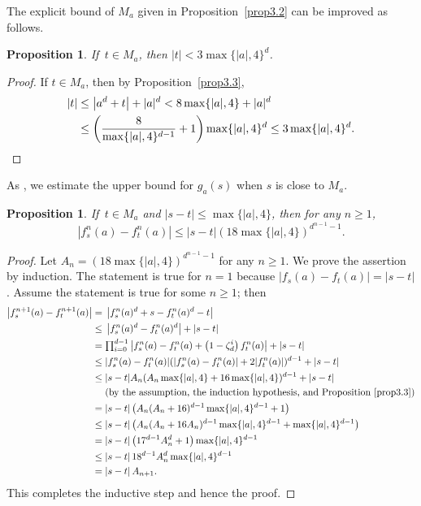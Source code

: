 \documentclass[10pt,a4paper]{amsart}
\numberwithin{equation}{section}
\theoremstyle{plain}
\newtheorem{prop}[thm]{Proposition}
\theoremstyle{definition}
\theoremstyle{remark}
\begin{document}
The explicit bound of $M_{a}$ given in Proposition~\ref{prop3.2}
can be improved as follows.

\begin{prop}\label{prop3.4}
  If\, $t\in M_{a}$, then $|t|<3\max\{|a|,4\}^{d}$.
\end{prop}

\begin{proof}
If $t\in M_{a}$, then by Proposition~\ref{prop3.3},
\begin{align*}
|t| & \leq\left|a^{d}+t\right|+|a|^{d}<8\max\{|a|,4\}+|a|^{d}\\
 & \leq\left(\frac{8}{\max\{|a|,4\}^{d-1}}+1\right)\max\{|a|,4\}^{d}\leq3\max\{|a|,4\}^{d}.\qedhere
\end{align*}
\end{proof}

As \cite[Section 3.3]{DKY2}, we estimate the upper bound for $g_{a}(s)$
when $s$ is close to $M_{a}$.

\begin{prop}\label{prop3.5}
  If\, $t\in M_{a}$ and $|s-t|\leq\max\{|a|,4\}$, then for any $n\geq1$,
\[
\left|f_{s}^{n}(a)-f_{t}^{n}(a)\right|\leq|s-t|(18\max\{|a|,4\})^{d^{n-1}-1}.
\]
\end{prop}

\begin{proof}
Let $A_{n}=(18\max\{|a|,4\})^{d^{n-1}-1}$ for any $n\geq1$. We prove
the assertion by induction. 
The statement is true for $n=1$ because $|f_{s}(a)-f_{t}(a)|=|s-t|$. 
Assume the statement is true for
some $n\geq1$; then
\allowdisplaybreaks
\begin{align*}
\left|f_{s}^{n+1}(a)-f_{t}^{n+1}(a)\right|
=\; & \left|f_{s}^{n}(a)^{d}+s-f_{t}^{n}(a)^{d}-t\right|\\
\leq\; & \left|f_{s}^{n}(a)^{d}-f_{t}^{n}(a)^{d}\right|+|s-t|\\
=\; & {\textstyle \prod_{i=0}^{d-1}}\left|f_{s}^{n}(a)-f_{t}^{n}(a)+\left(1-\zeta_{d}^{i}\right)f_{t}^{n}(a)\right|+|s-t|\\
\leq\; & |f_{s}^{n}(a)-f_{t}^{n}(a)|(|f_{s}^{n}(a)-f_{t}^{n}(a)|+2|f_{t}^{n}(a)|)^{d-1}+|s-t|\\
\leq\; & |s-t|A_{n}(A_{n}\max\{|a|,4\}+16\max\{|a|,4\})^{d-1}+|s-t|\\
 & \text{(by the assumption, the induction hypothesis, and Proposition~\ref{prop3.3})}\\
=\; & |s-t|\left(A_{n}(A_{n}+16)^{d-1}\max\{|a|,4\}^{d-1}+1\right)\\
\leq\; & |s-t|\left(A_{n}(A_{n}+16A_{n})^{d-1}\max\{|a|,4\}^{d-1}+\max\{|a|,4\}^{d-1}\right)\\
=\; & |s-t|\left(17^{d-1}A_{n}^{d}+1\right)\max\{|a|,4\}^{d-1}\\
\leq\; & |s-t|\,18^{d-1}A_{n}^{d}\max\{|a|,4\}^{d-1}\\
=\; & |s-t|\,A_{n+1}.
\end{align*}
This completes the inductive step and hence the proof.
\end{proof}
\end{document}

